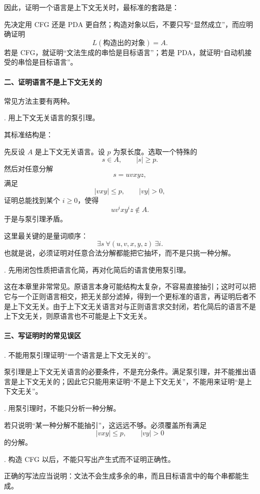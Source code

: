 \begin{answerred}
\begin{answernote}
\medskip
因此，证明一个语言是上下文无关时，最标准的套路是：

\medskip
\noindent
先决定用 CFG 还是 PDA 更自然；构造对象以后，不要只写“显然成立”，而应明确证明
\[
    L(\text{构造出的对象})=A.
\]
若是 CFG，就证明“文法生成的串恰是目标语言”；若是 PDA，就证明“自动机接受的串恰是目标语言”。

\paragraph{二、证明语言不是上下文无关的}
常见方法主要有两种。

\medskip
{}. 用上下文无关语言的泵引理。

其标准结构是：

\medskip
\noindent
先反设 $A$ 是上下文无关语言。设 $p$ 为泵长度。选取一个特殊的
\[
    s\in A,\qquad |s|\ge p.
\]
然后对任意分解
\[
    s=uvxyz,
\]
满足
\[
    |vxy|\le p,\qquad |vy|>0,
\]
证明总能找到某个 $i\ge 0$，使得
\[
    uv^ixy^iz\notin A.
\]
于是与泵引理矛盾。

\medskip
这里最关键的是量词顺序：
\[
    \exists s\ \forall (u,v,x,y,z)\ \exists i.
\]
也就是说，必须证明对任意合法分解都能把它抽坏，而不是只挑一种分解。

\medskip
{}. 先用闭包性质把语言化简，再对化简后的语言使用泵引理。

这在本章里非常常见。原语言本身可能结构太复杂，不容易直接抽引；这时可以把它与一个正则语言相交，把无关部分滤掉，得到一个更标准的语言，再证明后者不是上下文无关。由于上下文无关语言对与正则语言求交封闭，若化简后的语言不是上下文无关，则原语言也不可能是上下文无关。

\paragraph{三、写证明时的常见误区}
\medskip
{}. 不能用泵引理证明“一个语言是上下文无关的”。

泵引理是上下文无关语言的必要条件，不是充分条件。满足泵引理，并不能推出语言是上下文无关的；因此它只能用来证明“不是上下文无关”，不能用来证明“是上下文无关”。

\medskip
{}. 用泵引理时，不能只分析一种分解。

若只说明“某一种分解不能抽引”，这远远不够。必须覆盖所有满足
\[
    |vxy|\le p,\qquad |vy|>0
\]
的分解。

\medskip
{}. 构造 CFG 以后，不能只写出产生式而不证明正确性。

正确的写法应当说明：文法不会生成多余的串，而且目标语言中的每个串都能生成。


\end{answernote}
\end{answerred}
